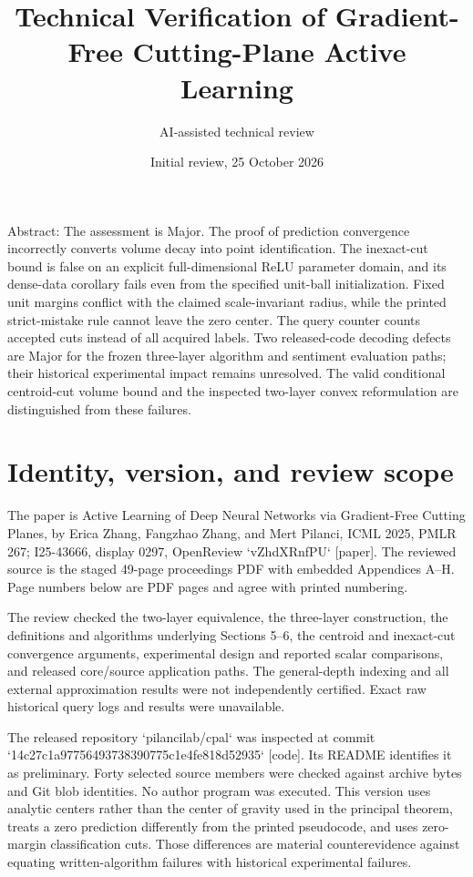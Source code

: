\documentclass[10pt]{article}
\title{Technical Verification of
Gradient-Free Cutting-Plane Active Learning}
\author{AI-assisted technical review}
\date{Initial review, 25 October 2026}
\begin{document}
\maketitle
Abstract: The assessment is Major. The proof of prediction convergence incorrectly converts volume decay into point identification. The inexact-cut bound is false on an explicit full-dimensional ReLU parameter domain, and its dense-data corollary fails even from the specified unit-ball initialization. Fixed unit margins conflict with the claimed scale-invariant radius, while the printed strict-mistake rule cannot leave the zero center. The query counter counts accepted cuts instead of all acquired labels. Two released-code decoding defects are Major for the frozen three-layer algorithm and sentiment evaluation paths; their historical experimental impact remains unresolved. The valid conditional centroid-cut volume bound and the inspected two-layer convex reformulation are distinguished from these failures.\par
\section*{Identity, version, and review scope}
The paper is Active Learning of Deep Neural Networks via Gradient-Free Cutting Planes, by Erica Zhang, Fangzhao Zhang, and Mert Pilanci, ICML 2025, PMLR 267; I25-43666, display 0297, OpenReview `vZhdXRnfPU` [paper]. The reviewed source is the staged 49-page proceedings PDF with embedded Appendices A–H. Page numbers below are PDF pages and agree with printed numbering.\par
The review checked the two-layer equivalence, the three-layer construction, the definitions and algorithms underlying Sections 5–6, the centroid and inexact-cut convergence arguments, experimental design and reported scalar comparisons, and released core/source application paths. The general-depth indexing and all external approximation results were not independently certified. Exact raw historical query logs and results were unavailable.\par
The released repository `pilancilab/cpal` was inspected at commit `14c27c1a97756493738390775c1e4fe818d52935` [code]. Its README identifies it as preliminary. Forty selected source members were checked against archive bytes and Git blob identities. No author program was executed. This version uses analytic centers rather than the center of gravity used in the principal theorem, treats a zero prediction differently from the printed pseudocode, and uses zero-margin classification cuts. Those differences are material counterevidence against equating written-algorithm failures with historical experimental failures.\par
\end{document}
